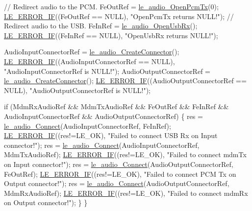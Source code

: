 \begin{DoxyCodeInclude}
{{{{{{{{{{{    \textcolor{comment}{// Redirect audio to the PCM.}
    FeOutRef = \hyperlink{le__audio__interface_8h_a5e112543e8525775aa670dc71b320766}{le\_audio\_OpenPcmTx}(0);
    \hyperlink{le__log_8h_aceaf11a11691d6c676e36dd317b38dbd}{LE\_ERROR\_IF}((FeOutRef == NULL), \textcolor{stringliteral}{"OpenPcmTx returns NULL!"});
    \textcolor{comment}{// Redirect audio to the USB.}
    FeInRef = \hyperlink{le__audio__interface_8h_acd8be89289067cef9441a8ed1d891146}{le\_audio\_OpenUsbRx}();
    \hyperlink{le__log_8h_aceaf11a11691d6c676e36dd317b38dbd}{LE\_ERROR\_IF}((FeInRef == NULL), \textcolor{stringliteral}{"OpenUsbRx returns NULL!"});

    AudioInputConnectorRef = \hyperlink{le__audio__interface_8h_a570aaf85086f00aca592acfbaaa237be}{le\_audio\_CreateConnector}();
    \hyperlink{le__log_8h_aceaf11a11691d6c676e36dd317b38dbd}{LE\_ERROR\_IF}((AudioInputConnectorRef == NULL), \textcolor{stringliteral}{"AudioInputConnectorRef is NULL!"});
    AudioOutputConnectorRef = \hyperlink{le__audio__interface_8h_a570aaf85086f00aca592acfbaaa237be}{le\_audio\_CreateConnector}();
    \hyperlink{le__log_8h_aceaf11a11691d6c676e36dd317b38dbd}{LE\_ERROR\_IF}((AudioOutputConnectorRef == NULL), \textcolor{stringliteral}{"AudioOutputConnectorRef is NULL!"});

    \textcolor{keywordflow}{if} (MdmRxAudioRef && MdmTxAudioRef && FeOutRef && FeInRef &&
        AudioInputConnectorRef && AudioOutputConnectorRef)
    \{
        res = \hyperlink{le__audio__interface_8h_a338df65b2fb1ae0140d86880adbcf0de}{le\_audio\_Connect}(AudioInputConnectorRef, FeInRef);
        \hyperlink{le__log_8h_aceaf11a11691d6c676e36dd317b38dbd}{LE\_ERROR\_IF}((res!=LE\_OK), \textcolor{stringliteral}{"Failed to connect USB Rx on Input connector!"});
        res = \hyperlink{le__audio__interface_8h_a338df65b2fb1ae0140d86880adbcf0de}{le\_audio\_Connect}(AudioInputConnectorRef, MdmTxAudioRef);
        \hyperlink{le__log_8h_aceaf11a11691d6c676e36dd317b38dbd}{LE\_ERROR\_IF}((res!=LE\_OK), \textcolor{stringliteral}{"Failed to connect mdmTx on Input connector!"});
        res = \hyperlink{le__audio__interface_8h_a338df65b2fb1ae0140d86880adbcf0de}{le\_audio\_Connect}(AudioOutputConnectorRef, FeOutRef);
        \hyperlink{le__log_8h_aceaf11a11691d6c676e36dd317b38dbd}{LE\_ERROR\_IF}((res!=LE\_OK), \textcolor{stringliteral}{"Failed to connect PCM Tx on Output connector!"});
        res = \hyperlink{le__audio__interface_8h_a338df65b2fb1ae0140d86880adbcf0de}{le\_audio\_Connect}(AudioOutputConnectorRef, MdmRxAudioRef);
        \hyperlink{le__log_8h_aceaf11a11691d6c676e36dd317b38dbd}{LE\_ERROR\_IF}((res!=LE\_OK), \textcolor{stringliteral}{"Failed to connect mdmRx on Output connector!"});
    \}
\}

}}}}}}}}}}}
\end{DoxyCodeInclude}
